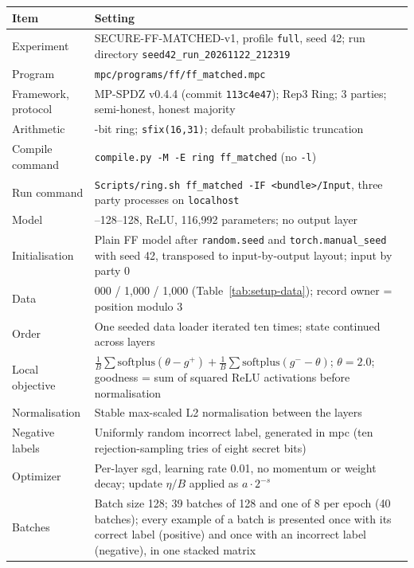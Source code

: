 \begin{table}[htbp]
\centering
\small
\begin{tabular}{@{}>{\raggedright\arraybackslash}p{4.3cm}>{\raggedright\arraybackslash}p{9.6cm}@{}}
\toprule
Item & Setting \\
\midrule
Experiment & SECURE-FF-MATCHED-v1, profile \texttt{full}, seed 42; run directory \texttt{seed42\_run\_20261122\_212319} \\
Program & \texttt{mpc/programs/ff/ff\_matched.mpc} \\
Framework, protocol & MP-SPDZ v0.4.4 (commit \texttt{113c4e47}); Rep3 Ring; 3 parties; semi-honest, honest majority \\
Arithmetic & 64-bit ring; \texttt{sfix(16,31)}; default probabilistic truncation \\
Compile command & \texttt{compile.py -M -E ring ff\_matched} (no \texttt{-l}) \\
Run command & \texttt{Scripts/ring.sh ff\_matched -IF \textless{}bundle\textgreater{}/Input}, three party processes on \texttt{localhost} \\
Model & 784--128--128, ReLU, 116{,}992 parameters; no output layer \\
Initialisation & Plain FF model after \texttt{random.seed} and \texttt{torch.manual\_seed} with seed 42, transposed to input-by-output layout; input by party 0 \\
Data & 5{,}000 / 1{,}000 / 1{,}000 (Table~\ref{tab:setup-data}); record owner = position modulo 3 \\
Order & One seeded data loader iterated ten times; state continued across layers \\
Local objective & $\frac1B\sum\mathrm{softplus}(\theta-g^{+})+\frac1B\sum\mathrm{softplus}(g^{-}-\theta)$; $\theta=2.0$; goodness = sum of squared ReLU activations before normalisation \\
Normalisation & Stable max-scaled L2 normalisation between the layers \\
Negative labels & Uniformly random incorrect label, generated in \ac{mpc} (ten rejection-sampling tries of eight secret bits) \\
Optimizer & Per-layer \ac{sgd}, learning rate 0.01, no momentum or weight decay; update $\eta/B$ applied as $a\cdot2^{-s}$ \\
Batches & Batch size 128; 39 batches of 128 and one of 8 per epoch (40 batches); every example of a batch is presented once with its correct label (positive) and once with an incorrect label (negative), in one stacked matrix \\

\end{tabular}
\end{table}
